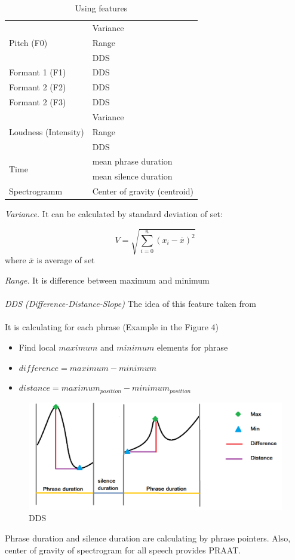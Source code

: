 \documentclass[12pt, letterpaper]{article}
\begin{document}
\begin{table}

\begin{tabular}{|p{2.2in}|p{2.2in}|} 
\hline
\multirow{3}{*}{Pitch (F0) }& Variance \\ \cline{2-2}
													& Range \\ \cline{2-2} 
													& DDS \\ \hline 
Formant 1 (F1) & DDS \\ \hline 
Formant 2 (F2) & DDS \\ \hline 
Formant 2 (F3) & DDS \\ \hline 
\multirow{3}{*}{Loudness (Intensity) } & Variance \\ \cline{2-2}
																		& Range \\ \cline{2-2}
																		& DDS \\ \hline 
\multirow{2}{*}{Time} & mean phrase duration \\ \cline{2-2} 
 & mean silence duration \\ \hline 
Spectrogramm & Center of gravity (centroid) \\ \hline 
\end{tabular}
	\caption{Using features}
	\label{Using features}
\end{table}
\emph{Variance.} It can be calculated by standard deviation of set:
\begin{center}
\[V=\sqrt{
\sum_{i=0}^{n}{
               (x_i-\overline{x})^2
               }
}
\]
 where  $\overline{x}$ is average of set\\
\end{center}
\emph{Range.} It is difference between maximum and minimum
\\\\
\emph{DDS (Difference-Distance-Slope)} The idea of this feature taken from\\ \cite{brittaelizabet}\\ It is calculating for each phrase (Example in the Figure 4) 
\begin{itemize}
	\item Find local $maximum$ and $minimum$ elements for phrase
	\item $difference=maximum-minimum$
	\item $distance=maximum_{position}-minimum_{position}$
\end{itemize}

\begin{figure}
	\centering
		\includegraphics[scale=0.5]{images/dds.png}
	\caption{DDS}
	\label{fig:dds}
\end{figure}
Phrase duration and silence duration are calculating by phrase pointers. Also, center of gravity of spectrogram for all speech provides PRAAT. 
\end{document}
